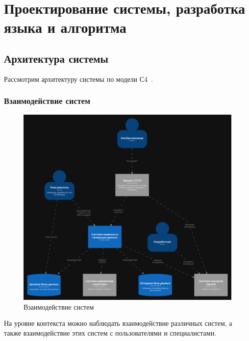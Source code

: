 \section{Проектирование системы, разработка языка и алгоритма}

\subsection{Архитектура системы}

Рассмотрим архитектуру системы по модели С4~\cite{c4-model}.

\subsubsection{Взаимодействие систем}

\begin{figure}
  \includegraphics[scale=0.15]{./img/structurizr-SystemLandscape.png}
  \caption{Взаимодействие систем}
  \label{System Context}
\end{figure}

На уровне контекста можно наблюдать взаимодействие различных систем, а также взаимодействие этих систем с пользователями и специалистами.

